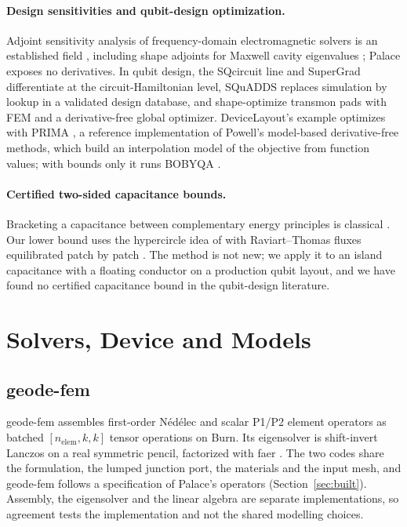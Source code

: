 \documentclass{anvil-paper}
\begin{document}
\paragraph{Design sensitivities and qubit-design optimization.}
Adjoint sensitivity analysis of frequency-domain electromagnetic solvers is
an established field \citep{nikolova2004adjoint}, including shape adjoints
for Maxwell cavity eigenvalues \citep{akcelik2005adjoint}; Palace exposes no
derivatives.
In qubit design, the SQcircuit line \citep{rajabzadeh2023analysis} and
SuperGrad \citep{wang2025supergrad} differentiate at the circuit-Hamiltonian
level, SQuADDS \citep{shanto2024squadds} replaces simulation by lookup in a
validated design database, and \citet{eun2023shape} shape-optimize transmon
pads with FEM and a derivative-free global optimizer.
DeviceLayout's example optimizes with PRIMA \citep{zhang2023prima}, a
reference implementation of Powell's model-based derivative-free methods,
which build an interpolation model of the objective from function values;
with bounds only it runs BOBYQA \citep{powell2009bobyqa}.

\paragraph{Certified two-sided capacitance bounds.}
Bracketing a capacitance between complementary energy principles is
classical \citep{specogna2011complementary}. Our lower bound uses the
hypercircle idea of \citet{prager1947approximations} with Raviart--Thomas
fluxes \citep{raviart1977mixed} equilibrated patch by patch
\citep{braess2007equilibrated,ern2015polynomial}. The method is not new; we
apply it to an island capacitance with a floating conductor on a
production qubit layout, and we have found no certified capacitance bound in the
qubit-design literature.

\section{Solvers, Device and Models}
\label{sec:setup}

\subsection{geode-fem}
\label{sec:architecture}

geode-fem assembles first-order N\'ed\'elec \citep{nedelec1980} and scalar
P1/P2 element operators as batched $[n_{\mathrm{elem}},k,k]$ tensor
operations on Burn. Its eigensolver is shift-invert Lanczos \citep{arpack}
on a real symmetric pencil, factorized with faer \citep{kazdadi2026faer}. The two codes share the
formulation, the lumped junction port, the materials and the input mesh,
and geode-fem follows a specification of Palace's operators
(Section~\ref{sec:built}). Assembly, the eigensolver and the linear algebra
are separate implementations, so agreement tests the implementation and
not the shared modelling choices.
\end{document}
